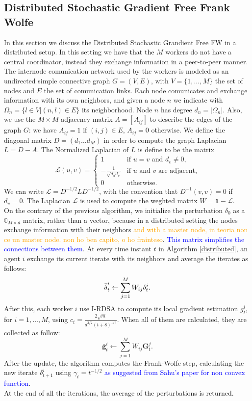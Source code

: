 \subsection{Distributed Stochastic Gradient Free Frank Wolfe}
In this section we discuss the Distributed Stochastic Grandient Free FW in a distributed setup. In this setting we have that the $M$ workers do not have a central coordinator, instead they exchange information in a peer-to-peer manner. The internode comunication network used by the workers is modeled as an undirected simple connective graph $G=(V,E)$, with $V=\{1, \dots, M\}$ the set of nodes and $E$ the set of comunication links. Each node comunicates and exchange information with its own neighbors, and given a node $n$ we indicate with $\Omega_n = \{l \in V | (n,l)\in E\}$ its neighborhood. Node $n$ has degree $d_n = |\Omega_n|$. Also, we use the $M \times M$ adjacency matrix $A=[A_{ij}]$ to describe the edges of the graph $G$: we have $A_{ij}=1$ if $(i,j) \in E$, $A_{ij}=0$ otherwise. We define the diagonal matrix $D=(d_1 \dots d_M)$ in order to compute the graph Laplacian $L=D-A$. The Normalized Laplacian of $L$ is define to be the matrix
\[
\mathcal{L}(u,v)=
\begin{cases}
	1 & \text{if $u=v$ and }d_v\ne0, \\
	-\frac{1}{\sqrt{d_ud_v}} & \text{if $u$ and $v$ are adjacent,}\\
	0 & \text{otherwise.}
	
\end{cases}
\]
We can write $\mathcal{L} = D^{-1/2}LD^{-1/2}$, with the convention that $D^{-1}(v,v) = 0$ if $d_v=0$. The Laplacian $\mathcal{L}$ is used to compute the weghted matrix $W = \mathbb{1}- \mathcal{L}$.\\
On the contrary of the previous algorithm, we initialize the perturbation \boldmath$\delta_0$ as a $\mathbb{0}_{M \times d}$ matrix, rather than a vector, because in a distributed setting the nodes exchange information with their neighbors \textcolor{orange}{and with a master node, in teoria non ce un master node. non ho ben capito, o ho frainteso}. \textcolor{blue}{This matrix simplifies the connections between them}. At every time instant $t$ in Algorithm \ref{distributed}, an agent $i$ exchange its current iterate with its neighbors and average the iterates as follows:
\[\bar{\text{\boldmath}\delta}_t^i \leftarrow \sum_{j=1}^{M} W_{ij}\text{\boldmath}\delta_t^i.\]
After this, each worker $i$ use I-RDSA to compute its local gradient estimation $g_t^i$, for $i= 1, \dots, M$, using $c_t = \frac{2\sqrt{m}}{d^{3/2}(t+8)^{1/3}}$. When all of them are calculated, they are collected as follow:
\[ \bar{\textbf{g}}_t^i \leftarrow \sum_{j=1}^{M} W_{ij}\textbf{G}_t^j.\]
After the update, the algorithm computes the Frank-Wolfe step, calculating the new iterate \boldmath$\delta_{t+1}^i$ using $\gamma_t= t^{-1/2}$ \textcolor{blue}{as suggested from Sahu's paper for non convex function}.\\
At the end of all the iterations, the average of the perturbations is returned.\\

